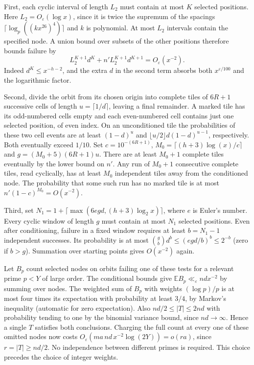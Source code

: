 \documentclass[11pt]{amsart}
\theoremstyle{definition}
\theoremstyle{remark}
\begin{document}
First, each cyclic interval of length $L_2$ must contain at most
$K$ selected positions. Here $L_2=O_\varepsilon(\log x)$, since
it is twice the supremum of the spacings
$\lceil\log_p((kx^{26})^4)\rceil$ and $k$ is polynomial.
At most $L_2$ intervals contain the specified node. A union bound
over subsets of the other positions therefore bounds failure by
\[
 L_2^{K+1}d^K+n'L_2^{K+1}d^{K+1}=O_\varepsilon(x^{-2}).
\]
Indeed $d^K\le x^{-h-2}$, and the extra $d$ in the second term
absorbs both $x^{\varepsilon/100}$ and the logarithmic factor.

Second, divide the orbit from its chosen origin into complete tiles
of $6R+1$ successive cells of length $u=\lceil1/d\rceil$,
leaving a final remainder. A marked tile has its odd-numbered cells
empty and each even-numbered cell contains just one selected
position, of even index. On an unconditioned tile the probabilities
of these two cell events are at least $(1-d)^u$ and
$\lfloor u/2\rfloor d(1-d)^{u-1}$, respectively. Both eventually
exceed $1/10$. Set $c=10^{-(6R+1)}$,
$M_0=\lceil(h+3)\log(x)/c\rceil$ and $g=(M_0+5)(6R+1)u$.
There are at least $M_0+1$ complete tiles eventually by the
lower bound on $n'$. Any run of $M_0+1$ consecutive complete
tiles, read cyclically, has at least $M_0$ independent tiles away
from the conditioned node. The probability that some such run has
no marked tile is at most $n'(1-c)^{M_0}=O(x^{-2})$.

Third, set $N_1=1+\lceil\max(6e gd,(h+3)\log_2 x)\rceil$,
where $e$ is Euler's number. Every cyclic window of length $g$
must contain at most $N_1$ selected positions. Even after
conditioning, failure in a fixed window requires at least
$b=N_1-1$ independent successes. Its probability is at most
$\binom{g}{b}d^b\le(egd/b)^b\le2^{-b}$ (zero if $b>g$).
Summation over starting points gives $O(x^{-2})$ again.

Let $B_p$ count selected nodes on orbits failing one of these tests
for a relevant prime $p<Y$ of large order. The conditional bounds
give $\mathbb E B_p\ll_\varepsilon nd x^{-2}$ by summing over
nodes. The weighted sum of $B_p$ with weights $(\log p)/p$ is at
most four times its expectation with probability at least $3/4$,
by Markov's inequality (automatic for zero expectation).
Also $nd/2\le |T|\le2nd$ with probability tending to one by
the binomial variance bound, since $nd\to\infty$. Hence a single
$T$ satisfies both conclusions. Charging the full count at every
one of these omitted nodes now costs
$O_\varepsilon(ma\,nd\,x^{-2}\log(2Y))=o(ra)$, since
$r=|T|\ge nd/2$. No independence between different primes is
required. This choice precedes the choice of integer weights.
\end{document}
